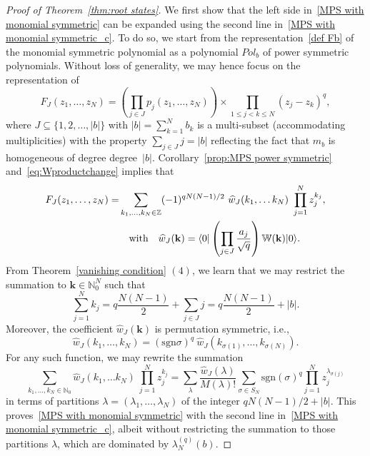 \documentclass[letterpaper, DIV=17]{scrartcl}
\numberwithin{equation}{section}
\theoremstyle{definition}
\newcommand{\pol}{Pol}
\begin{document}
 \begin{proof}[Proof of Theorem~\ref{thm:root states}]
 We first show that the left side in~\eqref{MPS with monomial symmetric} can be expanded using the second line in~\eqref{MPS with monomial symmetric_c}. 
 To do so, we start from the representation~\eqref{def Fb} of the monomial symmetric polynomial as a polynomial $ \pol_{b} $ of power symmetric polynomials. Without loss of generality, we may hence focus on the representation 
 of 
 $$
 F_J(z_1,\dots , z_N ) = \left( \prod_{j\in J} p_j(z_1,\dots,z_N)  \right) \times \prod_{1\leq j<k\leq N} (z_j-z_k)^q ,
 $$
 where $ J \subseteq \{ 1, 2, \dots , |b| \} $ with $ |b| = \sum_{k=1}^N b_k $ is a multi-subset (accommodating multiplicities) with the property $ \sum_{j\in J} j = | b| $ reflecting the fact that $ m_{b} $ is homogeneous of degree degree~$  | b | $.  
Corollary~\ref{prop:MPS power symmetric} and~\eqref{eq:Wproductchange} implies that
\begin{align}\label{eq:Laughint}
 F_J(z_1,\dots , z_N ) = & \sum_{k_1, \dots, k_N\in \mathbb{Z}} (-1)^{qN(N-1)/2} \ \widehat w_J(k_1, \dots k_N) \  \prod_{j=1}^N z_j^{k_j} , \\
 & \quad\mbox{with}\quad  \widehat w_J(\mathbf{k}) = \langle 0 \vert \left(\prod_{j\in J } \frac{a_{j}}{\sqrt{q}} \right) \mathbb{W}(\mathbf{k}) \vert 0 \rangle . \notag
\end{align}
From Theorem~\ref{vanishing condition}  $(4)$, we learn that we may restrict the summation to $ \mathbf{k} \in \mathbb{N}_0^N $ such that 
$$ \sum_{j=1}^N k_j = q \frac{N(N-1)}{2} +   \sum_{j\in J} j  = q \frac{N(N-1)}{2} + |b| . $$
Moreover, the coefficient  $  \widehat  w_J(\mathbf{k}) $ is permutation symmetric, i.e., $$ \widehat  w_J(k_{1} , \dots ,k_{N} ) = (\textrm{sgn} \sigma)^q \  \widehat  w_J(k_{\sigma(1)} , \dots ,k_{\sigma(N)} ) . $$
For any such function, we may rewrite the summation
\begin{equation}\label{eq:correctcounting}
 \sum_{k_1, \dots, k_N\in \mathbb{N}_0} \widehat w_J(k_1, \dots k_N) \  \prod_{j=1}^N z_j^{k_j} = \sum_{\lambda}  \frac{ \widehat w_J(\lambda)}{M(\lambda)!}  \sum_{\sigma\in S_N} \mathrm{sgn}(\sigma)^q \prod_{j=1}^N z_{j}^{\lambda_{\sigma(j)}} 
\end{equation}
in terms of partitions $ \lambda=(\lambda_1, \dots, \lambda_N ) $ of the integer $ q N(N-1)/2 + |b| $. 
This proves~\eqref{MPS with monomial symmetric} with the second line in~\eqref{MPS with monomial symmetric_c}, albeit without restricting the summation to those partitions $ \lambda $, which are dominated by $ \lambda^{(q)}_N(b ) $. 


\end{proof}
\end{document}
